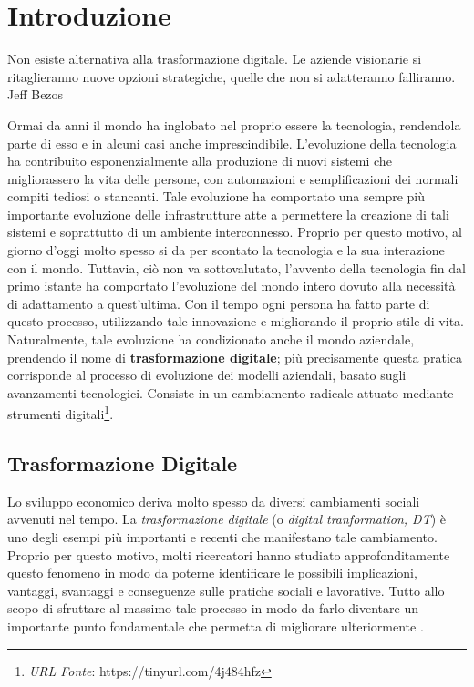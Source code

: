\chapter{Introduzione}
\label{ch:Introduzione}

\begin{citazione}
Non esiste alternativa alla trasformazione digitale. Le aziende visionarie si ritaglieranno nuove opzioni strategiche, quelle che non si adatteranno falliranno. Jeff Bezos
\end{citazione}

Ormai da anni il mondo ha inglobato nel proprio essere la tecnologia, rendendola parte di esso e in alcuni casi anche imprescindibile. L’evoluzione della tecnologia ha contribuito esponenzialmente alla produzione di nuovi sistemi che migliorassero la vita delle persone, con automazioni e semplificazioni dei normali compiti tediosi o stancanti. Tale evoluzione ha comportato una sempre più importante evoluzione delle infrastrutture atte a permettere la creazione di tali sistemi e soprattutto di un ambiente interconnesso. Proprio per questo motivo, al giorno d'oggi molto spesso si da per scontato la tecnologia e la sua interazione con il mondo. Tuttavia, ciò non va sottovalutato, l'avvento della tecnologia fin dal primo istante ha comportato l'evoluzione del mondo intero dovuto alla necessità di adattamento a quest'ultima. Con il tempo ogni persona ha fatto parte di questo processo, utilizzando tale innovazione e migliorando il proprio stile di vita. Naturalmente, tale evoluzione ha condizionato anche il mondo aziendale, prendendo il nome di \textbf{trasformazione digitale}; più precisamente questa pratica corrisponde al processo di evoluzione dei modelli aziendali, basato sugli avanzamenti tecnologici. Consiste in un cambiamento radicale attuato mediante strumenti digitali\footnote{\textit{URL Fonte}: https://tinyurl.com/4j484hfz}.

\section{Trasformazione Digitale}
Lo sviluppo economico deriva molto spesso da diversi cambiamenti sociali avvenuti nel tempo. La \textit{trasformazione digitale} (o \textit{digital tranformation, DT}) è uno degli esempi più importanti e recenti che manifestano tale cambiamento. Proprio per questo motivo, molti ricercatori hanno studiato approfonditamente questo fenomeno in modo da poterne identificare le possibili implicazioni, vantaggi, svantaggi e conseguenze sulle pratiche sociali e lavorative. Tutto allo scopo di sfruttare al massimo tale processo in modo da farlo diventare un importante punto fondamentale che permetta di migliorare ulteriormente \cite{sciencedirect_digital_transformation}.


